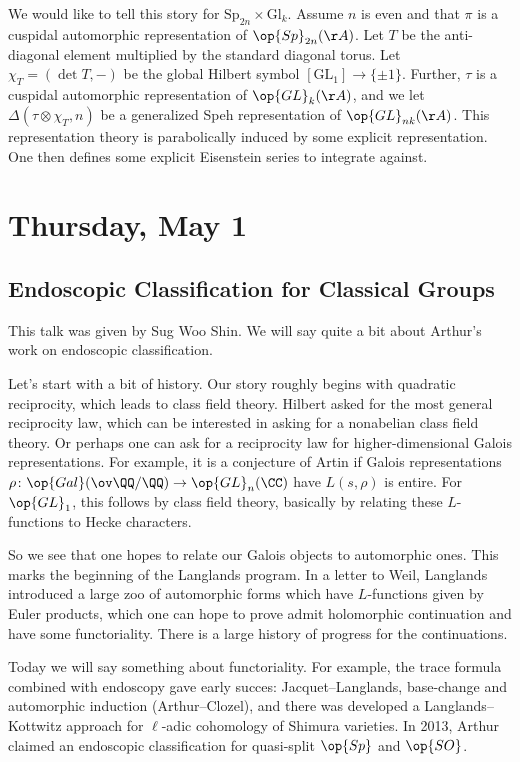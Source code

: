 \documentclass{article}
\begin{document}
We would like to tell this story for $\mathrm{Sp}_{2n}\times\mathrm{Gl}_k$. Assume $n$ is even and that $\pi$ is a cuspidal automorphic representation of $\op{Sp}_{2n}(\AA)$. Let $T$ be the anti-diagonal element multiplied by the standard diagonal torus. Let $\chi_T=(\det T,-)$ be the global Hilbert symbol $[\mathrm{GL}_1]\to\{\pm1\}$. Further, $\tau$ is a cuspidal automorphic representation of $\op{GL}_k(\AA)$, and we let $\Delta(\tau\otimes\chi_T,n)$ be a generalized Speh representation of $\op{GL}_{nk}(\AA)$. This representation theory is parabolically induced by some explicit representation. One then defines some explicit Eisenstein series to integrate against.

\section{Thursday, May 1}

\subsection{Endoscopic Classification for Classical Groups}
This talk was given by Sug Woo Shin. We will say quite a bit about Arthur's work on endoscopic classification.

Let's start with a bit of history. Our story roughly begins with quadratic reciprocity, which leads to class field theory. Hilbert asked for the most general reciprocity law, which can be interested in asking for a nonabelian class field theory. Or perhaps one can ask for a reciprocity law for higher-dimensional Galois representations. For example, it is a conjecture of Artin if Galois representations $\rho\colon\op{Gal}(\ov\QQ/\QQ)\to\op{GL}_n(\CC)$ have $L(s,\rho)$ is entire. For $\op{GL}_1$, this follows by class field theory, basically by relating these $L$-functions to Hecke characters.

So we see that one hopes to relate our Galois objects to automorphic ones. This marks the beginning of the Langlands program. In a letter to Weil, Langlands introduced a large zoo of automorphic forms which have $L$-functions given by Euler products, which one can hope to prove admit holomorphic continuation and have some functoriality. There is a large history of progress for the continuations.

Today we will say something about functoriality. For example, the trace formula combined with endoscopy gave early succes: Jacquet--Langlands, base-change and automorphic induction (Arthur--Clozel), and there was developed a Langlands--Kottwitz approach for $\ell$-adic cohomology of Shimura varieties. In 2013, Arthur claimed an endoscopic classification for quasi-split $\op{Sp}$ and $\op{SO}$.
\end{document}
